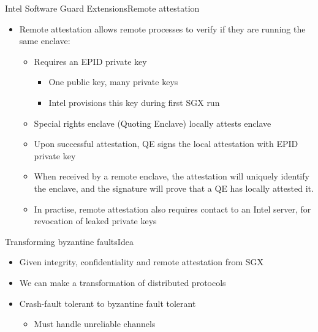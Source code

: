\documentclass{beamer}
\begin{document}
\begin{frame}{Intel Software Guard Extensions}{Remote attestation}
    \begin{itemize}
    	\item Remote attestation allows remote processes to verify if they are running the same enclave:
    	\begin{itemize}

  			\vfill

    		\item Requires an EPID private key
    		\begin{itemize}
    			\item One public key, many private keys
    			\item Intel provisions this key during first SGX run
    		\end{itemize}

  			\vfill

    		\item Special rights enclave (Quoting Enclave) locally attests enclave

  			\vfill

    		\item Upon successful attestation, QE signs the local attestation with EPID private key

  			\vfill

    		\item When received by a remote enclave, the attestation will uniquely identify the enclave, and the signature will prove that a QE has locally attested it.

  			\vfill

  			\item In practise, remote attestation also requires contact to an Intel server, for revocation of leaked private keys
    	\end{itemize}
    \end{itemize}
\end{frame}

\begin{frame}{Transforming byzantine faults}{Idea} %
  \begin{itemize}
  	\item Given integrity, confidentiality and remote attestation from SGX

  	\vfill

  	\item We can make a transformation of distributed protocols

  	\vfill

  	\item Crash-fault tolerant to byzantine fault tolerant
  	\begin{itemize}
  		\item Must handle unreliable channels
  	\end{itemize}
  \end{itemize}
\end{frame}
\end{document}
